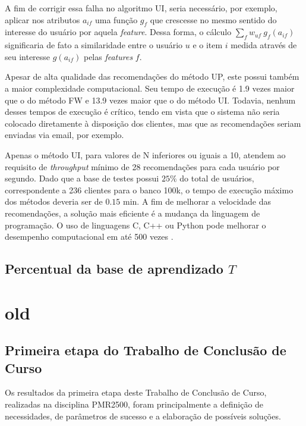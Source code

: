 A fim de corrigir essa falha no algoritmo UI, seria necessário, por exemplo, aplicar nos atributos $a_{if}$ uma função $g_f$ que crescesse no mesmo sentido do interesse do usuário por aquela \textit{feature}. Dessa forma, o cálculo $\sum_f w_{uf}~g_f\left(a_{if}\right)$ significaria de fato a similaridade entre o usuário $u$ e o item $i$ medida através de seu interesse $g\left(a_{if}\right)$ pelas \textit{features} $f$.

Apesar de alta qualidade das recomendações do método UP, este possui também a maior complexidade computacional. Seu tempo de execução é 1.9 vezes maior que o do método FW e 13.9 vezes maior que o do método UI. Todavia, nenhum desses tempos de execução é crítico, tendo em vista que o sistema não seria colocado diretamente à disposição dos clientes, mas que as recomendações seriam enviadas via email, por exemplo. 

Apenas o método UI, para valores de N inferiores ou iguais a 10, atendem ao requisito de \textit{throughput} mínimo de 28 recomendações para cada usuário por segundo. Dado que a base de testes possui $25\%$ do total de usuários, correspondente a 236 clientes para o banco 100k, o tempo de execução máximo dos métodos deveria ser de $0.15$ min. A fim de melhorar a velocidade das recomendações, a solução mais eficiente é a mudança da linguagem de programação. O uso de linguagens C, C++ ou Python pode melhorar o desempenho computacional em até 500 vezes \cite{benchmarkingR}. 

\section{Percentual da base de aprendizado $T$} %
\label{sec:percentual_da_base_de_aprendizado_}


\chapter[old]{old}
\label{chap:old}

\section{Primeira etapa do Trabalho de Conclusão de Curso} %
\label{sec:primeira_etapa_do_trabalho_de_conclus_o_de_curso}

Os resultados da primeira etapa deste Trabalho de Conclusão de Curso, realizadas na disciplina PMR2500, foram principalmente a definição de necessidades, de parâmetros de sucesso e a elaboração de possíveis soluções. 

